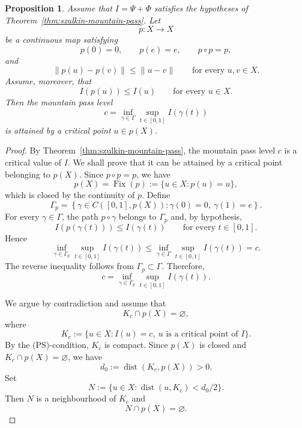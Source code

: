 \documentclass[11pt,reqno]{amsart}
\theoremstyle{plain}
\newtheorem{proposition}[theorem]{Proposition}
\theoremstyle{definition}
\numberwithin{equation}{section}
\begin{document}
\begin{proposition}
\label{prop:abstract-positivity}
Assume that $I=\Psi+\Phi$ satisfies the hypotheses of
Theorem~\ref{thm:szulkin-mountain-pass}. Let
$$
p:X\rightarrow X
$$
be a continuous map satisfying
$$
p(0)=0,\qquad p(e)=e,\qquad p\circ p=p,
$$
and
\begin{equation}\label{eq:nonexp}
\|p(u)-p(v)\|\leq\|u-v\|
\qquad\text{for every }u,v\in X.
\end{equation}
Assume, moreover, that
$$
I(p(u))\leq I(u)
\qquad\text{for every }u\in X.
$$
Then the mountain pass level
$$
c=\inf_{\gamma\in\Gamma}\sup_{t\in[0,1]}I(\gamma(t))
$$
is attained by a critical point $u\in p(X)$. 
\end{proposition}

\begin{proof}
By Theorem~\ref{thm:szulkin-mountain-pass}, the mountain pass level
$c$ is a critical value of $I$. We shall prove that it can be attained
by a critical point belonging to $p(X)$. Since $p\circ p=p$, we have
$$
p(X)=\operatorname{Fix}(p)
:=\{u\in X:p(u)=u\},
$$
which is closed by the continuity of $p$. Define
$$
\Gamma_p
=
\left\{
\gamma\in C([0,1],p(X)):
\gamma(0)=0,\ \gamma(1)=e
\right\}.
$$
For every $\gamma\in\Gamma$, the path $p\circ\gamma$ belongs to
$\Gamma_p$ and, by hypothesis,
$$
I(p(\gamma(t)))\leq I(\gamma(t))
\qquad\text{for every }t\in[0,1].
$$
Hence
$$
\inf_{\gamma\in\Gamma_p}\sup_{t\in[0,1]}I(\gamma(t))
\leq
\inf_{\gamma\in\Gamma}\sup_{t\in[0,1]}I(\gamma(t))=c.
$$
The reverse inequality follows from $\Gamma_p\subset\Gamma$. Therefore,
\begin{equation}\label{eq:cgammap}
c=
\inf_{\gamma\in\Gamma_p}\sup_{t\in[0,1]}I(\gamma(t)).
\end{equation}

We argue by contradiction and assume that
\begin{equation}\label{eq:HContr}
K_c\cap p(X)=\varnothing,
\end{equation}
where
$$
K_c:=\{u\in X:I(u)=c,\ u\text{ is a critical point of }I\}.
$$
By the (PS)-condition, $K_c$ is compact. Since $p(X)$ is closed and
$K_c\cap p(X)=\varnothing$, we have
\begin{equation}\label{eq:distKc}
d_0:=\operatorname{dist}(K_c,p(X))>0.
\end{equation}
Set
$$
N:=\{u\in X:\operatorname{dist}(u,K_c)<d_0/2\}.
$$
Then $N$ is a neighbourhood of $K_c$ and
\begin{equation}\label{eq:Ndisjoint}
N\cap p(X)=\varnothing.
\end{equation}


\end{proof}
\end{document}

